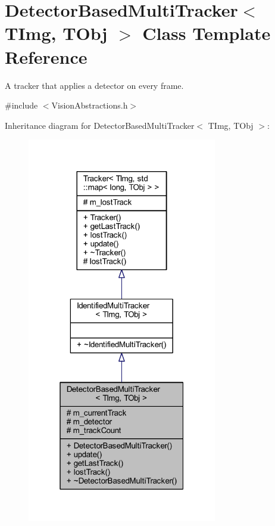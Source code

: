 \hypertarget{class_vision_core_1_1_abstractions_1_1_detector_based_multi_tracker}{}\section{Detector\+Based\+Multi\+Tracker$<$ T\+Img, T\+Obj $>$ Class Template Reference}
\label{class_vision_core_1_1_abstractions_1_1_detector_based_multi_tracker}


A tracker that applies a detector on every frame.  




{\ttfamily \#include $<$Vision\+Abstractions.\+h$>$}



Inheritance diagram for Detector\+Based\+Multi\+Tracker$<$ T\+Img, T\+Obj $>$\+:
\nopagebreak
\begin{figure}[H]
\begin{center}
\leavevmode
\includegraphics[width=235pt]{class_vision_core_1_1_abstractions_1_1_detector_based_multi_tracker__inherit__graph}
\end{center}
\end{figure}


